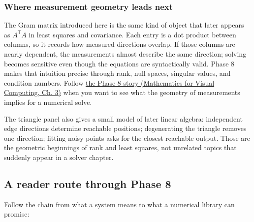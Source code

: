 \subsubsection{Where measurement geometry leads next}\label{02-foundations-ii-ch039-where-measurement-geometry-leads-next}

The Gram matrix introduced here is the same kind of object that later appears as \(A^\mathsf T A\) in least squares and covariance. Each entry is a dot product between columns, so it records how measured directions overlap. If those columns are nearly dependent, the measurements almost describe the same direction; solving becomes sensitive even though the equations are syntactically valid. Phase 8 makes that intuition precise through rank, null spaces, singular values, and condition numbers. Follow \href{../02-Mathematics-for-Visual-Computing/main.pdf\#nameddest=01-foundations-i-ch019-the-graphics-problem-hiding-inside-a-matrix-equation}{the Phase 8 story (Mathematics for Visual Computing, Ch. 3)} when you want to see what the geometry of measurements implies for a numerical solve.

The triangle panel also gives a small model of later linear algebra: independent edge directions determine reachable positions; degenerating the triangle removes one direction; fitting noisy points asks for the closest reachable output. Those are the geometric beginnings of rank and least squares, not unrelated topics that suddenly appear in a solver chapter.

\subsection{A reader route through Phase 8}\label{02-foundations-ii-ch039-a-reader-route-through-phase-8}

Follow the chain from what a system means to what a numerical library can promise:


